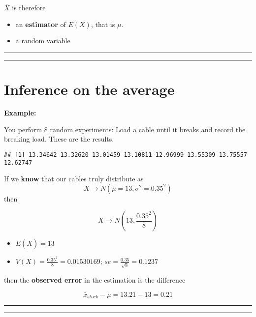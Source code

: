 \documentclass[
]{book}
\providecommand{\tightlist}{%
  \setlength{\itemsep}{0pt}\setlength{\parskip}{0pt}}
\begin{document}
\(\bar{X}\) is therefore

\begin{itemize}
\item
  an \textbf{estimator} of \(E(X)\), that is \(\mu\).
\item
  a random variable
\end{itemize}

\begin{center}\rule{0.5\linewidth}{0.5pt}\end{center}

\begin{center}\rule{0.5\linewidth}{0.5pt}\end{center}

\hypertarget{inference-on-the-average-1}{%
\section{Inference on the average}\label{inference-on-the-average-1}}

\textbf{Example:}

You perform \(8\) random experiments: Load a cable until it breaks and record the breaking load. These are the results.

\begin{verbatim}
## [1] 13.34642 13.32620 13.01459 13.10811 12.96999 13.55309 13.75557 12.62747
\end{verbatim}

If we \textbf{know} that our cables truly distribute as \[X \rightarrow N(\mu=13, \sigma^2=0.35^2)\] then

\[\bar{X} \rightarrow N(13, \frac{0.35^2}{8})\]

\begin{itemize}
\tightlist
\item
  \(E(\bar{X})=13\)
\item
  \(V(X)=\frac{0.35^2}{8}=0.01530169\); \(se=\frac{0.35}{\sqrt{8}}=0.1237\)
\end{itemize}

then the \textbf{observed error} in the estimation is the difference

\[\bar{x}_{stock}-\mu=13.21-13=0.21\]

\begin{center}\rule{0.5\linewidth}{0.5pt}\end{center}

\begin{center}\rule{0.5\linewidth}{0.5pt}\end{center}
\end{document}
